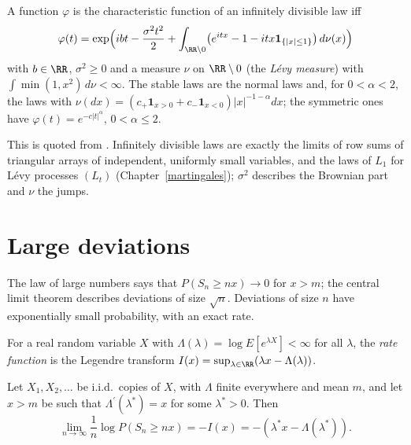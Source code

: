 \begin{theorem}\label{probability:theorem-levy-khintchine}
A function $\varphi$ is the characteristic function of an infinitely divisible law iff
\[
\varphi(t) = \exp\Bigl(ibt - \frac{\sigma^2t^2}{2} + \int_{\RR \setminus 0}\bigl(e^{itx} - 1 - itx\mathbf{1}_{\{|x| \leq 1\}}\bigr)\,d\nu(x)\Bigr)
\]
with $b \in \RR$, $\sigma^2 \geq 0$ and a measure $\nu$ on $\RR \setminus 0$ (the \emph{L\'evy measure}) with $\int\min(1, x^2)\,d\nu < \infty$. The stable laws are the normal laws and, for $0 < \alpha < 2$, the laws with
$\nu(dx) = (c_+\mathbf{1}_{x > 0} + c_-\mathbf{1}_{x < 0})|x|^{-1-\alpha}dx$; the symmetric ones have $\varphi(t) = e^{-c|t|^\alpha}$, $0 < \alpha \leq 2$.
\end{theorem}

This is quoted from \cite[Chapter XVII]{feller-2}. Infinitely divisible laws are exactly the limits of row sums of triangular arrays of independent, uniformly small variables, and the laws of $L_1$ for L\'evy processes
$(L_t)$ (Chapter~\ref{martingales}); $\sigma^2$ describes the Brownian part and $\nu$ the jumps.

\section{Large deviations}\label{probability:section-large-deviations}

The law of large numbers says that $P(S_n \geq nx) \to 0$ for $x > m$; the central limit theorem describes deviations of size $\sqrt n$. Deviations of size $n$ have exponentially small probability, with an exact rate.

\begin{definition}\label{probability:definition-rate-function}
For a real random variable $X$ with $\Lambda(\lambda) = \log E[e^{\lambda X}] < \infty$ for all $\lambda$, the \emph{rate function} is the Legendre transform $I(x) = \sup_{\lambda \in \RR}(\lambda x - \Lambda(\lambda))$.
\end{definition}

\begin{theorem}[Cram\'er]\label{probability:theorem-cramer}
Let $X_1, X_2, \ldots$ be i.i.d.\ copies of $X$, with $\Lambda$ finite everywhere and mean $m$, and let $x > m$ be such that $\Lambda^{\prime}(\lambda^*) = x$ for some $\lambda^* > 0$. Then
\[
\lim_{n \to \infty}\frac1n\log P(S_n \geq nx) = -I(x) = -(\lambda^*x - \Lambda(\lambda^*)).
\]
\end{theorem}

